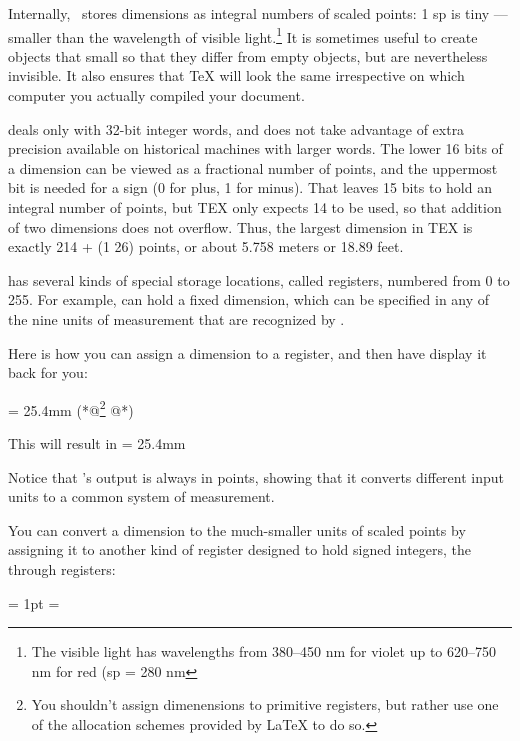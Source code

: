 Internally, \tex\ stores dimensions as integral numbers of scaled points:
1 sp is tiny ---  smaller than the wavelength of visible light.\footnote{The visible light has wavelengths from 380--450 nm for violet up to 620--750 nm for red (sp = 280 nm} It is sometimes
useful to create objects that small so that they differ from empty objects,
but are nevertheless invisible. It also ensures that TeX will look the same irrespective on which computer you actually compiled your document.

\tex deals only with 32-bit integer words, and does not take advantage
of extra precision available on historical machines with larger words. The
lower 16 bits of a dimension can be viewed as a fractional number of points,
and the uppermost bit is needed for a sign (0 for plus, 1 for minus). That
leaves 15 bits to hold an integral number of points, but TEX only expects 14
to be used, so that addition of two dimensions does not overflow. Thus, the
largest dimension in TEX is exactly 214 + (1 26) points, or about 5.758  
meters or 18.89 feet.

\tex has several kinds of special storage locations, called registers, numbered
from 0 to 255. For example, can hold a fixed dimension,
which can be specified in any of the nine units of measurement that are
recognized by \tex.

Here is how you can assign a dimension to a register, and then have \tex
display it back for you:

\begin{teXXX}
 = 25.4mm (*@\protect\footnote{You shouldn't assign dimenensions to primitive registers, but rather use one of the allocation schemes provided by LaTeX to do so.}  @*)
\the{}
\end{teXXX}

This will result in
 = 25.4mm

\the{}


Notice that \tex’s output is always in points, showing that it converts different
input units to a common system of measurement.

You can convert a dimension to the much-smaller units of scaled points
by assigning it to another kind of \tex register designed to hold signed integers,
the through registers:

\begin{texexample}{}{}
 = 1pt
 = 
\the{}
\end{texexample}

